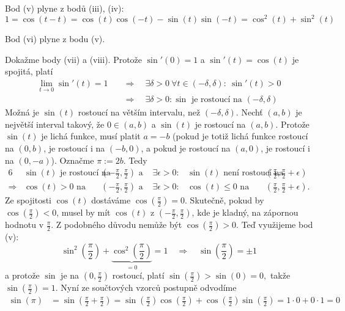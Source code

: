 \begin{důkaz}
Bod (v) plyne z bodů (iii), (iv):
\begin{equation*}
  1=\cos(t-t)=\cos(t)\cos(-t)-\sin(t)\sin(-t)=\cos^{2}(t)+\sin^{2}(t)
\end{equation*}

Bod (vi) plyne z bodu (v).

Dokažme body (vii) a (viii). Protože $\sin'(0)=1$ a $\sin'(t)=\cos(t)$ je spojitá, platí
\begin{align*}
	\lim_{t\to 0}\sin'(t)=1 \quad &\Rightarrow \quad \exists \delta>0\ \forall t\in(-\delta,\delta)\colon\ \sin'(t)>0 \\
				      &\Rightarrow \quad \exists \delta>0\colon \sin \text{ je rostoucí na } (-\delta,\delta)
\end{align*}
Možná je $\sin(t)$ rostoucí na větším intervalu, než $(-\delta,\delta).$ Nechť $(a,b)$ je největší interval takový, že $0\in(a,b)$ a $\sin(t)$ je rostoucí na $(a,b)$. Protože $\sin(t)$ je lichá funkce, musí platit $a=-b$ (pokud je totiž lichá funkce rostoucí na $(0,b)$, je rostoucí i na $(-b,0)$, a pokud je rostoucí na $(a,0)$, je rostoucí i na $(0,-a)$). Označme $\pi:= 2b.$ Tedy 
\begin{alignat*}{6}
  &\sin(t) \text{ je rostoucí na } &\left(-\frac{\pi}{2},\frac{\pi}{2}\right) \text{ a } &\exists \epsilon>0\colon &\sin(t) \text{ není rostoucí na } &\left(\frac{\pi}{2},\frac{\pi}{2}+\epsilon\right) \\
	\Rightarrow &\cos(t)>0 \text{ na } &\left(-\frac{\pi}{2},\frac{\pi}{2}\right) \text{ a } &\exists \epsilon>0\colon &\cos(t)\leq 0 \text{ na } &\left(\frac{\pi}{2},\frac{\pi}{2}+\epsilon\right).
\end{alignat*}
Ze spojitosti $\cos(t)$ dostáváme $\cos\left(\frac{\pi}{2}\right)=0.$ Skutečně, pokud by $\cos\left(\frac{\pi}{2}\right)<0$, musel by mít $\cos(t)$  z $\left(-\frac{\pi}{2},\frac{\pi}{2}\right)$, kde je kladný, na zápornou hodnotu v $\frac{\pi}{2}.$ Z podobného důvodu nemůže být $\cos(\frac{\pi}{2})>0.$ Teď využijeme bod (v):
\begin{equation*}
	\sin^{2}\left(\frac{\pi}{2}\right)+\underbrace{\cos^{2}\left(\frac{\pi}{2}\right)}_{=0}=1 \quad \Rightarrow \quad \sin\left(\frac{\pi}{2}\right)=\pm 1
\end{equation*}
a protože $\sin$ je na $(0,\frac{\pi}{2})$ rostoucí, platí $\sin\left(\frac{\pi}{2}\right)>\sin(0)=0,$ takže $\sin\left(\frac{\pi}{2}\right)=1.$ Nyní ze součtových vzorců postupně odvodíme
\newcommand{\pia}{\frac{\pi}{2}}
\begin{align*}
	\sin(\pi) &= \sin\left(\pia\!+\!\pia\right)=\sin(\pia)\cos(\pia)\!+\!\cos(\pia)\sin(\pia)=1\!\cdot\! 0+0\!\cdot\! 1 = 0 \\

\end{align*}
\end{důkaz}
